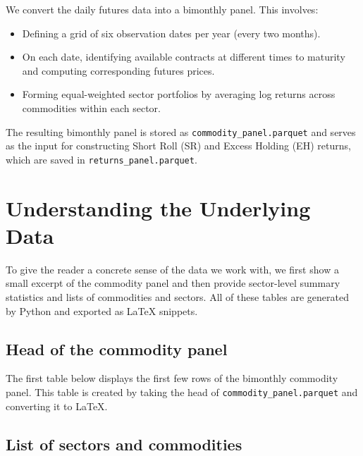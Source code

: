 \documentclass[11pt]{article}
\begin{document}
We convert the daily futures data into a bimonthly panel.
This involves:
\begin{itemize}
  \item Defining a grid of six observation dates per year (every two months).
  \item On each date, identifying available contracts at different times to
        maturity and computing corresponding futures prices.
  \item Forming equal-weighted sector portfolios by averaging log returns
        across commodities within each sector.
\end{itemize}

The resulting bimonthly panel is stored as \texttt{commodity\_panel.parquet}
and serves as the input for constructing Short Roll (SR) and Excess Holding
(EH) returns, which are saved in \texttt{returns\_panel.parquet}.

\section{Understanding the Underlying Data}

To give the reader a concrete sense of the data we work with, we first show a
small excerpt of the commodity panel and then provide sector-level summary
statistics and lists of commodities and sectors.
All of these tables are generated by Python and exported as \LaTeX{}
snippets.

\subsection*{Head of the commodity panel}

The first table below displays the first few rows of the bimonthly commodity
panel.
This table is created by taking the head of
\texttt{commodity\_panel.parquet} and converting it to \LaTeX.

\begin{table}[h]
  \centering
  \caption{Head of the bimonthly commodity panel.
  The table shows a few rows of the panel used to construct SR and EH returns,
  including observation dates, commodity identifiers, sectors, and prices at
  several maturities.}
  \label{tab:panelhead}
  \resizebox{\textwidth}{!}{%
    
  }
\end{table}

\subsection*{List of sectors and commodities}
\end{document}
